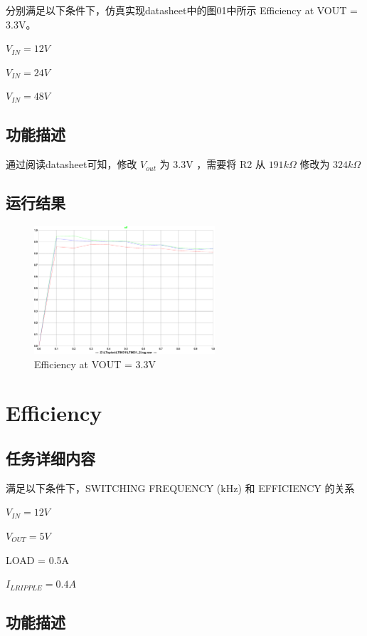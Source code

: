 \documentclass[lang=cn,10pt]{elegantbook}
\begin{document}
分别满足以下条件下，仿真实现datasheet中的图01中所示 Efficiency at VOUT = 3.3V。

$V_{IN} = 12V$

$V_{IN} = 24V$

$V_{IN} = 48V$

\subsection{功能描述}

通过阅读datasheet可知，修改 $V_{out}$ 为 3.3V ，需要将 R2 从 $191k\Omega$ 修改为 $324k\Omega$

\subsection{运行结果}

\begin{figure}[!htb]
    \centering\includegraphics[page=1, width=0.6\textwidth]{figure/G02.pdf}
    \caption{Efficiency at VOUT = 3.3V}
\end{figure}

\section{Efficiency}

\subsection{任务详细内容}

满足以下条件下，SWITCHING FREQUENCY (kHz) 和 EFFICIENCY 的关系

$V_{IN} = 12V$

$V_{OUT} = 5V$

LOAD = 0.5A

$I_{LRIPPLE} = 0.4A$

\subsection{功能描述}
\end{document}
